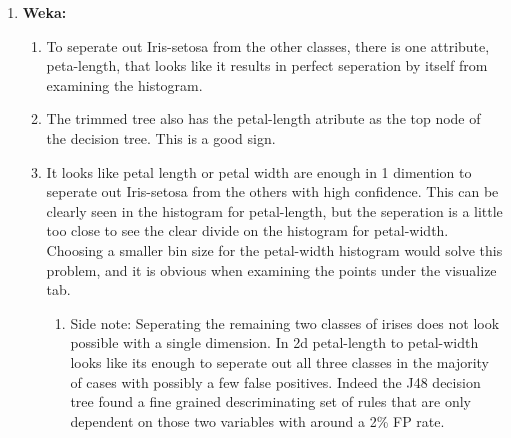\documentclass[12pt]{article}
\newtheorem{lemma}{Lemma}[section]
\begin{document}
\begin{enumerate}
\begin{lemma}
    The VC-dimension of homogeneous half-spaces in $\mathcal{R}^d$ is $d$.
\end{lemma}
\begin{proof}
    This is the direct result of combining the previous two lemmas.
\end{proof}

\item \textbf{Weka: }

\begin{enumerate}
\item To seperate out Iris-setosa from the other classes, there is one attribute,
peta-length, that looks like it results in perfect seperation by itself
from examining the histogram.
\item The trimmed tree also has the petal-length atribute as the top node
of the decision tree. This is a good sign.
\item It looks like petal length or petal width are enough in 1 dimention
to seperate out Iris-setosa from the others with high confidence.
This can be clearly seen in the histogram for petal-length, but the
seperation is a little too close to see the clear divide on the histogram
for petal-width. Choosing a smaller bin size for the petal-width histogram
would solve this problem, and it is obvious when examining the points
under the visualize tab.

\begin{enumerate}
\item Side note: Seperating the remaining two classes of irises does not
look possible with a single dimension. In 2d petal-length to petal-width
looks like its enough to seperate out all three classes in the majority
of cases with possibly a few false positives. Indeed the J48 decision
tree found a fine grained descriminating set of rules that are only
dependent on those two variables with around a 2\% FP rate.\end{enumerate}
\end{enumerate}
\end{enumerate}
\end{document}

